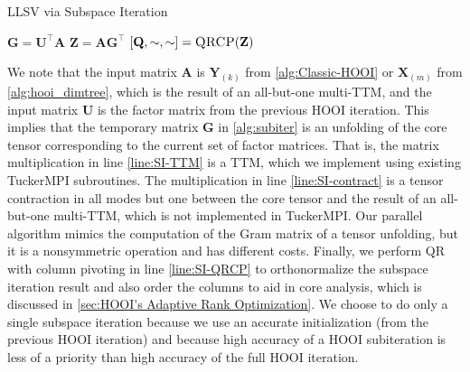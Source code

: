     \begin{algorithm}
        \caption{LLSV via Subspace Iteration}
        \label{alg:subiter}
        \begin{algorithmic}[1]
                \State $\mathbf{G} = \mathbf{U}^\intercal \mathbf{A} $ \label{line:SI-TTM}
                \State $\mathbf{Z} = \mathbf{A} \mathbf{G}^\intercal$ \label{line:SI-contract}
                \State $[\mathbf{Q}, \sim, \sim] = \Call{QRCP}{\mathbf{Z}}$ \label{line:SI-QRCP}
        \EndFunction
        \end{algorithmic}
    \end{algorithm}

    We note that the input matrix $\mathbf{A}$ is $\mathbf{Y}_{(k)}$ from
    \cref{alg:Classic-HOOI} or $\mathbf{X}_{(m)}$ from \cref{alg:hooi_dimtree},
    which is the result of an all-but-one multi-TTM, and the input matrix
    $\mathbf{U}$ is the factor matrix from the previous HOOI iteration. This implies
    that the temporary matrix $\mathbf{G}$ in \cref{alg:subiter} is an unfolding of
    the core tensor corresponding to the current set of factor matrices. That
    is, the matrix multiplication in line \ref{line:SI-TTM} is a TTM, which we
    implement using existing TuckerMPI subroutines. The multiplication in
    line \ref{line:SI-contract} is a tensor contraction in all modes but one between
    the core tensor and the result of an all-but-one multi-TTM, which is not
    implemented in TuckerMPI. Our parallel algorithm mimics the computation of
    the Gram matrix of a tensor unfolding, but it is a nonsymmetric operation
    and has different costs. Finally, we perform QR with column pivoting in
    line \ref{line:SI-QRCP} to orthonormalize the subspace iteration result and also
    order the columns to aid in core analysis, which is discussed in
    \cref{sec:HOOI's Adaptive Rank Optimization}. We choose to do only a single subspace iteration
    because we use an accurate initialization (from the previous HOOI iteration)
    and because high accuracy of a HOOI subiteration is less of a priority than
    high accuracy of the full HOOI iteration.

